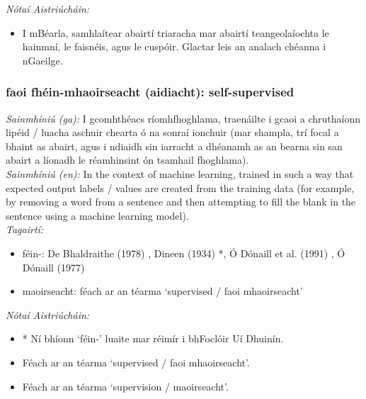 \documentclass{article}
\begin{document}
 \noindent \textit{Nótaí Aistriúcháin:}
\begin{itemize}
	\item I mBéarla, samhlaítear abairtí triaracha mar abairtí teangeolaíochta le hainmní, le faisnéis, agus le cuspóir. Glactar leis an analach chéanna i nGaeilge.
\end{itemize}


\subsubsection*{faoi fhéin-mhaoirseacht (aidiacht): self-supervised}
 \noindent \textit{Sainmhíniú (ga):} I gcomhthéacs ríomhfhoghlama, traenáilte i gcaoi a chruthaíonn lipéid / luacha aschuir chearta ó na sonraí ionchuir (mar shampla, trí focal a bhaint as abairt, agus i ndiaidh sin iarracht a dhéanamh as an bearna sin san abairt a líonadh le réamhinsint ón tsamhail fhoghlama).
\\
 \noindent \textit{Sainmhíniú (en):} In the context of machine learning, trained in such a way that expected output labels / values are created from the training data (for example, by removing a word from a sentence and then attempting to fill the blank in the sentence using a machine learning model).
\\
 \noindent \textit{Tagairtí:}
\begin{itemize}
	\item féin-: De Bhaldraithe (1978) \cite{de-bhaldraithe}, Dineen (1934) \cite{dineen}*, Ó Dónaill et al. (1991) \cite{focloir-beag}, Ó Dónaill (1977) \cite{odonaill}
	\item maoirseacht: féach ar an téarma `supervised / faoi mhaoirseacht'
\end{itemize}

 \noindent \textit{Nótaí Aistriúcháin:}
\begin{itemize}
	\item * Ní bhíonn `féin-' luaite mar réimír i bhFoclóir Uí Dhuinín.
	\item Féach ar an téarma `supervised / faoi mhaoirseacht'.
	\item Féach ar an téarma `supervision / maoirseacht'.
\end{itemize}
\end{document}
